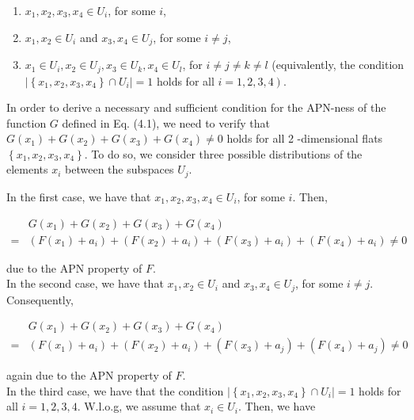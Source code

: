 \documentclass[10pt]{article}
\begin{document}
\begin{enumerate}
  \item $x_{1}, x_{2}, x_{3}, x_{4} \in U_{i}$, for some $i$,
  \item $x_{1}, x_{2} \in U_{i}$ and $x_{3}, x_{4} \in U_{j}$, for some $i \neq j$,
  \item $x_{1} \in U_{i}, x_{2} \in U_{j}, x_{3} \in U_{k}, x_{4} \in U_{l}$, for $i \neq j \neq k \neq l$ (equivalently, the condition $\left|\left\{x_{1}, x_{2}, x_{3}, x_{4}\right\} \cap U_{i}\right|=1$ holds for all $\left.i=1,2,3,4\right)$.
\end{enumerate}

In order to derive a necessary and sufficient condition for the APN-ness of the function $G$ defined in Eq. (4.1), we need to verify that $G\left(x_{1}\right)+G\left(x_{2}\right)+G\left(x_{3}\right)+G\left(x_{4}\right) \neq 0$ holds for all 2 -dimensional flats $\left\{x_{1}, x_{2}, x_{3}, x_{4}\right\}$. To do so, we consider three possible distributions of the elements $x_{i}$ between the subspaces $U_{j}$.

In the first case, we have that $x_{1}, x_{2}, x_{3}, x_{4} \in U_{i}$, for some $i$. Then,

$$
\begin{aligned}
& G\left(x_{1}\right)+G\left(x_{2}\right)+G\left(x_{3}\right)+G\left(x_{4}\right) \\
= & \left(F\left(x_{1}\right)+a_{i}\right)+\left(F\left(x_{2}\right)+a_{i}\right)+\left(F\left(x_{3}\right)+a_{i}\right)+\left(F\left(x_{4}\right)+a_{i}\right) \neq 0
\end{aligned}
$$

due to the APN property of $F$.\\
In the second case, we have that $x_{1}, x_{2} \in U_{i}$ and $x_{3}, x_{4} \in U_{j}$, for some $i \neq j$. Consequently,

$$
\begin{aligned}
& G\left(x_{1}\right)+G\left(x_{2}\right)+G\left(x_{3}\right)+G\left(x_{4}\right) \\
= & \left(F\left(x_{1}\right)+a_{i}\right)+\left(F\left(x_{2}\right)+a_{i}\right)+\left(F\left(x_{3}\right)+a_{j}\right)+\left(F\left(x_{4}\right)+a_{j}\right) \neq 0
\end{aligned}
$$

again due to the APN property of $F$.\\
In the third case, we have that the condition $\left|\left\{x_{1}, x_{2}, x_{3}, x_{4}\right\} \cap U_{i}\right|=1$ holds for all $i=1,2,3,4$. W.l.o.g, we assume that $x_{i} \in U_{i}$. Then, we have
\end{document}
